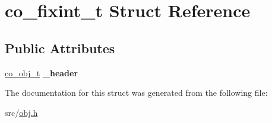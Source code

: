 \hypertarget{structco__fixint__t}{\section{co\+\_\+fixint\+\_\+t Struct Reference}
\label{structco__fixint__t}
}
\subsection*{Public Attributes}
\begin{DoxyCompactItemize}
\item 
\hypertarget{structco__fixint__t_a6d2de741ecbeb2d4c29555fba5945786}{\hyperlink{structco__obj__t}{co\+\_\+obj\+\_\+t} {\bfseries \+\_\+header}}\label{structco__fixint__t_a6d2de741ecbeb2d4c29555fba5945786}

\end{DoxyCompactItemize}


The documentation for this struct was generated from the following file\+:\begin{DoxyCompactItemize}
\item 
src/\hyperlink{obj_8h}{obj.\+h}\end{DoxyCompactItemize}
